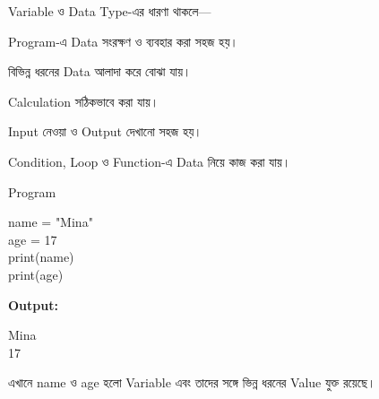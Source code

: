 
Variable ও Data Type-এর ধারণা থাকলে—

\begin{compacttwocolpoints}

\item Program-এ Data সংরক্ষণ ও ব্যবহার করা সহজ হয়।

\item বিভিন্ন ধরনের Data আলাদা করে বোঝা যায়।

\item Calculation সঠিকভাবে করা যায়।

\item Input নেওয়া ও Output দেখানো সহজ হয়।

\item Condition, Loop ও Function-এ Data নিয়ে কাজ করা যায়।

\end{compacttwocolpoints}



\begin{examplebox}{Program}

\begin{codebox}

\begin{english}
\ttfamily
name = "Mina"\\
age = 17\\[1mm]
print(name)\\
print(age)
\end{english}

\end{codebox}

\textbf{Output:}

\begin{codebox}

\begin{english}
\ttfamily
Mina\\
17
\end{english}

\end{codebox}

এখানে
\textenglish{\ttfamily name}
ও
\textenglish{\ttfamily age}
হলো Variable এবং তাদের সঙ্গে ভিন্ন ধরনের Value যুক্ত রয়েছে।

\end{examplebox}

